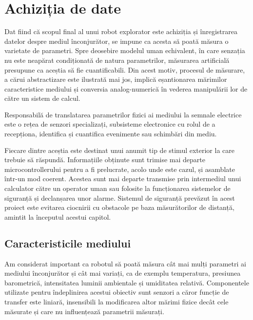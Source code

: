 \section{Achiziția de date}

Dat fiind că scopul final al unui robot explorator este achiziția și înregistrarea datelor despre mediul înconjurător, se impune ca acesta să poată măsura o varietate de parametri. Spre deosebire modelul uman echivalent, în care senzația nu este neapărat condiționată de natura parametrilor, măsurarea artificială presupune ca aceștia să fie cuantificabili. Din acest motiv, procesul de măsurare, a cărui abstractizare este ilustrată mai jos, implică eșantionarea mărimilor caracteristice mediului și conversia analog-numerică în vederea manipulării lor de către un sistem de calcul.

Responsabilă de translatarea parametrilor fizici ai mediului la semnale electrice este o rețea de senzori specializați, subsisteme electronice cu rolul de a recepționa, identifica și cuantifica evenimente sau schimbări din mediu. 


Fiecare dintre aceștia este destinat unui anumit tip de stimul exterior la care trebuie să răspundă. Informațiile obținute sunt trimise mai departe microcontrollerului pentru a fi prelucrate, acolo unde este cazul, și asamblate într-un mod coerent. Acestea sunt mai departe transmise prin intermediul unui calculator către un operator uman sau folosite la funcționarea sistemelor de siguranță și declanșarea unor alarme. Sistemul de siguranță prevăzut în acest proiect este evitarea ciocnirii cu obstacole pe baza măsurătorilor de distanță, amintit la începutul acestui capitol.

\subsection{Caracteristicile mediului}

Am considerat important ca robotul să poată măsura cât mai mulți parametri ai mediului înconjurător și cât mai variați, ca de exemplu temperatura, presiunea barometrică, intensitatea luminii ambientale și umiditatea \mbox{relativă}. \mbox{Componentele} utilizate pentru îndeplinirea acestui obiectiv sunt senzori a \mbox{căror} funcție de transfer este liniară, insensibili la modificarea altor mărimi fizice decât cele măsurate și care nu influențează parametrii măsurați.

